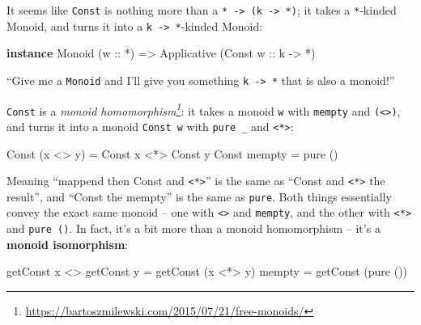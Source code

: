 \documentclass[]{article}
\newenvironment{Shaded}{}{}
\newcommand{\DataTypeTok}[1]{\textcolor[rgb]{0.56,0.13,0.00}{#1}}
\newcommand{\FunctionTok}[1]{\textcolor[rgb]{0.02,0.16,0.49}{#1}}
\newcommand{\KeywordTok}[1]{\textcolor[rgb]{0.00,0.44,0.13}{\textbf{#1}}}
\newcommand{\NormalTok}[1]{#1}
\newcommand{\OtherTok}[1]{\textcolor[rgb]{0.00,0.44,0.13}{#1}}
\renewcommand{\href}[2]{#2\footnote{\url{#1}}}
\begin{document}
It seems like \texttt{Const} is nothing more than a
\texttt{*\ -\textgreater{}\ (k\ -\textgreater{}\ *)}; it takes a
\texttt{*}-kinded Monoid, and turns it into a
\texttt{k\ -\textgreater{}\ *}-kinded Monoid:

\begin{Shaded}
\begin{Highlighting}[]
\KeywordTok{instance} \DataTypeTok{Monoid}\NormalTok{ (}\OtherTok{w ::} \FunctionTok{*}\NormalTok{) }\OtherTok{=>} \DataTypeTok{Applicative}\NormalTok{ (}\DataTypeTok{Const}\OtherTok{ w ::}\NormalTok{ k }\OtherTok{->} \FunctionTok{*}\NormalTok{)}
\end{Highlighting}
\end{Shaded}

``Give me a \texttt{Monoid} and I'll give you something
\texttt{k\ -\textgreater{}\ *} that is also a monoid!''

\texttt{Const} is a
\emph{\href{https://bartoszmilewski.com/2015/07/21/free-monoids/}{monoid
homomorphism}}: it takes a monoid \texttt{w} with \texttt{mempty} and
\texttt{(\textless{}\textgreater{})}, and turns it into a monoid
\texttt{Const\ w} with \texttt{pure\ \_} and
\texttt{\textless{}*\textgreater{}}:

\begin{Shaded}
\begin{Highlighting}[]
\DataTypeTok{Const}\NormalTok{ (x }\FunctionTok{<>}\NormalTok{ y) }\FunctionTok{=} \DataTypeTok{Const}\NormalTok{ x }\FunctionTok{<*>} \DataTypeTok{Const}\NormalTok{ y}
\DataTypeTok{Const}\NormalTok{ mempty   }\FunctionTok{=}\NormalTok{ pure ()}
\end{Highlighting}
\end{Shaded}

Meaning ``mappend then Const and \texttt{\textless{}*\textgreater{}}'' is the
same as ``Const and \texttt{\textless{}*\textgreater{}} the result'', and
``Const the mempty'' is the same as \texttt{pure}. Both things essentially
convey the exact same monoid -- one with \texttt{\textless{}\textgreater{}} and
\texttt{mempty}, and the other with \texttt{\textless{}*\textgreater{}} and
\texttt{pure\ ()}. In fact, it's a bit more than a monoid homomorphism -- it's a
\textbf{monoid isomorphism}:

\begin{Shaded}
\begin{Highlighting}[]
\NormalTok{getConst x }\FunctionTok{<>}\NormalTok{ getConst y }\FunctionTok{=}\NormalTok{ getConst (x }\FunctionTok{<*>}\NormalTok{ y)}
\NormalTok{mempty                   }\FunctionTok{=}\NormalTok{ getConst (pure ())}
\end{Highlighting}
\end{Shaded}
\end{document}
